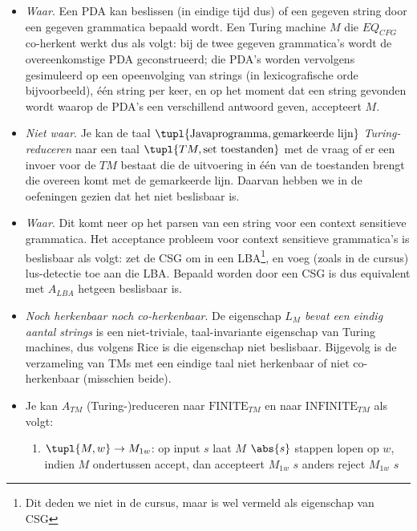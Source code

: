\documentclass[fleqn]{article}
\begin{document}
\begin{answer}\hfill
\begin{itemize}
 \item \textit{Waar}. Een PDA kan beslissen (in eindige tijd dus) of een
gegeven string door een gegeven grammatica bepaald wordt.  Een
Turing machine $M$ die $EQ_{CFG}$ co-herkent werkt dus als volgt: bij de
twee gegeven grammatica's wordt de overeenkomstige PDA geconstrueerd;
die PDA's worden vervolgens gesimuleerd op een opeenvolging van
strings (in lexicografische orde bijvoorbeeld), \'{e}\'{e}n string per
keer, en op het moment dat een string gevonden wordt waarop de PDA's een
verschillend antwoord geven, accepteert $M$.

 \item \textit{Niet waar}. Je kan de taal $\tupl{\mbox{Javaprogramma},\mbox{gemarkeerde lijn}}$
{\em Turing-reduceren} naar een taal $\tupl{TM,\mbox{set toestanden}}$ met de vraag of
er een invoer voor de $TM$ bestaat die de uitvoering in \'e\'en van de toestanden
brengt die overeen komt met de gemarkeerde lijn. Daarvan hebben we in de oefeningen gezien dat het niet
beslisbaar is.


 \item \textit{Waar}. Dit komt neer op het parsen van een string voor
een context sensitieve grammatica. Het acceptance probleem voor
context sensitieve grammatica's is beslisbaar als volgt: zet de CSG om
in een LBA\footnote{Dit deden we niet in de cursus, maar is wel
vermeld als eigenschap van CSG}, en voeg (zoals in de cursus)
lus-detectie toe aan die LBA. Bepaald worden door een CSG is dus
equivalent met $A_{LBA}$ hetgeen beslisbaar is.


 \item \textit{Noch herkenbaar noch co-herkenbaar}. De eigenschap {\em
$L_M$ bevat een eindig aantal strings} is een niet-triviale,
taal-invariante eigenschap van Turing machines, dus volgens Rice is die
eigenschap niet beslisbaar. Bijgevolg is de verzameling van TMs met
een eindige taal niet herkenbaar of niet co-herkenbaar (misschien
beide).

\item Je kan $A_{TM}$ (Turing-)reduceren naar $\mbox{FINITE}_{TM}$ en naar
$\mbox{INFINITE}_{TM}$ als volgt:
\begin{enumerate}
\item $\tupl{M,w}\rightarrow M_{1w}$: op input $s$ laat $M$ $\abs{s}$ stappen lopen op $w$,
   	     	     indien $M$ ondertussen accept, dan accepteert $M_{1w}$ $s$
		     	                          anders reject $M_{1w}$ $s$


\end{enumerate}
\end{itemize}
\end{answer}
\end{document}

